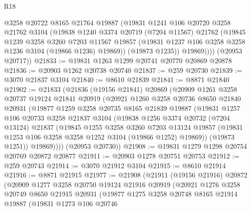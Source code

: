 \begin{lexlean}{R18}
\begin{coremodule}
            @3258
            @20722
            @8165
            @21764
            @19887
            (@19831
              @1241
              @106
              @20720
              @3258
              @21762
              @3104
              (@19838
                @1240
                @3374
                @20719
                (@7204 @11567)
                @21762
                (@19845
                  @1239
                  @3258
                  @3260
                  @7203
                  @11567
                  @19857
                  (@19831 @1237 @106 @3258 @3258 @1236 @3104 (@19866 @1236) @19869))
                (@19873 @1235))
              @19869))))
      (@20953 @20717))
@21833 := @19831 @1263 @1299 @20741 @20770 @20869 @20878
@21836 := @20903 @1262 @20738 @20740
@21837 := @259 @20730
@21839 := @3070 @21837 @3104
@21840 := @8610 @21839
@21841 := @8871 @21840
@21902 := @21833
    (@21836
      (@19156 @21841)
      @20869
      (@20909
        @1261
        @3258
        @20737
        @19124
        @21841
        @20919
        (@20921
          @1260
          @3258
          @20736
          @8650
          @21840
          @20931
          (@19877
            @1259
            @3258
            @20735
            @8165
            @21839
            @19887
            (@19831
              @1257
              @106
              @20733
              @3258
              @21837
              @3104
              (@19838
                @1256
                @3374
                @20732
                (@7204 @13124)
                @21837
                (@19845
                  @1255
                  @3258
                  @3260
                  @7203
                  @13124
                  @19857
                  (@19831 @1253 @106 @3258 @3258 @1252 @3104 (@19866 @1252) @19869))
                (@19873 @1251))
              @19869))))
      (@20953 @20730))
@21908 := @19831 @1279 @1298 @20754 @20769 @20872 @20877
@21911 := @20903 @1278 @20751 @20753
@21912 := @259 @20743
@21914 := @3070 @21912 @3104
@21915 := @8610 @21914
@21916 := @8871 @21915
@21977 := @21908
    (@21911
      (@19156 @21916)
      @20872
      (@20909
        @1277
        @3258
        @20750
        @19124
        @21916
        @20919
        (@20921
          @1276
          @3258
          @20749
          @8650
          @21915
          @20931
          (@19877
            @1275
            @3258
            @20748
            @8165
            @21914
            @19887
            (@19831
              @1273
              @106
              @20746

\end{coremodule}
\end{lexlean}
